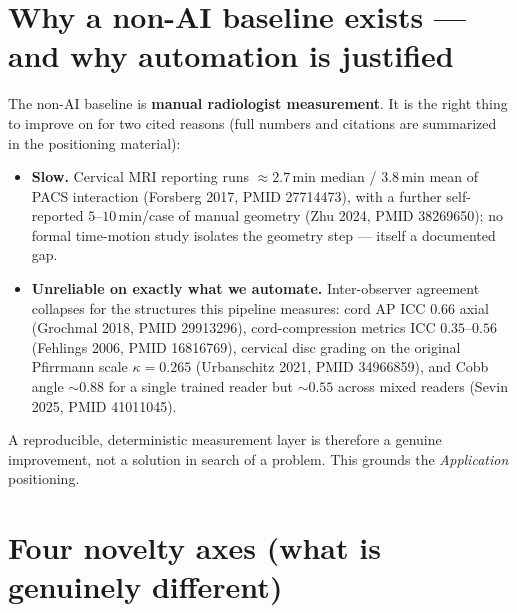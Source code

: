 \documentclass[11pt]{article}
\begin{document}
\section{Why a non-AI baseline exists --- and why automation is justified}
The non-AI baseline is \textbf{manual radiologist measurement}. It is the right thing to improve on for
two cited reasons (full numbers and citations are summarized in the positioning material):
\begin{itemize}
  \item \textbf{Slow.} Cervical MRI reporting runs $\approx 2.7$\,min median / $3.8$\,min mean of
  PACS interaction (Forsberg 2017, PMID 27714473), with a further self-reported $5$--$10$\,min/case of
  manual geometry (Zhu 2024, PMID 38269650); no formal time-motion study isolates the geometry step ---
  itself a documented gap.
  \item \textbf{Unreliable on exactly what we automate.} Inter-observer agreement collapses for the
  structures this pipeline measures: cord AP ICC $0.66$ axial (Grochmal 2018, PMID 29913296),
  cord-compression metrics ICC $0.35$--$0.56$ (Fehlings 2006, PMID 16816769), cervical disc grading on
  the original Pfirrmann scale $\kappa = 0.265$ (Urbanschitz 2021, PMID 34966859), and Cobb angle
  $\sim 0.88$ for a single trained reader but $\sim 0.55$ across mixed readers (Sevin 2025,
  PMID 41011045).
\end{itemize}
A reproducible, deterministic measurement layer is therefore a genuine improvement, not a solution in
search of a problem. This grounds the \emph{Application} positioning.

\section{Four novelty axes (what is genuinely different)}
\end{document}
